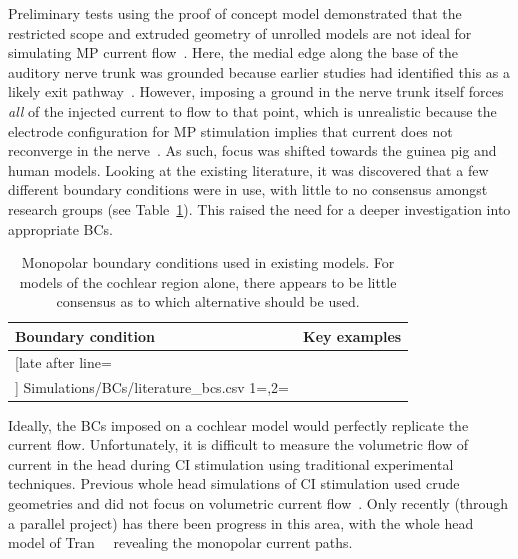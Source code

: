 Preliminary tests using the proof of concept model demonstrated that the
restricted scope and extruded geometry of unrolled models are not ideal for
simulating MP current flow~\cite{wong2012}. Here, the medial edge along the base
of the auditory nerve trunk was grounded because earlier studies had identified
this as a likely exit pathway~\cite{vonbekesy1951,girzon1987}. However, imposing
a ground in the nerve trunk itself forces \emph{all} of the injected current to
flow to that point, which is unrealistic because the electrode configuration for
MP stimulation implies that current does not reconverge in the
nerve~\cite{baker1989}. As such, focus was shifted towards the guinea pig and
human models. Looking at the existing literature, it was discovered that a few
different boundary conditions were in use, with little to no consensus amongst
research groups (see Table~\ref{table:existing_bcs}). This raised the need for a
deeper investigation into appropriate BCs.

\begin{table}
	\centering
	\sffamily
	\small
	\caption[Monopolar boundary conditions used in existing models]{Monopolar
	boundary conditions used in existing models. For models of the cochlear
	region alone, there appears to be little consensus as to which alternative
	should be used.}
	\label{table:existing_bcs}
	
	\begin{tabularx}{0.58\textwidth}{l X}
		\toprule
		\textbf{Boundary condition \phantom{\hspace{8mm}}}	& \textbf{Key examples} \\
		\midrule
		
		\csvreader[late after line=\\]%
			{Simulations/BCs/literature_bcs.csv}%
			{1=\bc,2=\models}%
 			{\bc & \models}%
		\bottomrule
	\end{tabularx}
	
\end{table}

Ideally, the BCs imposed on a cochlear model would perfectly replicate the
\invivo{} current flow. Unfortunately, it is difficult to measure the volumetric
flow of current in the head during CI stimulation using traditional experimental
techniques. Previous whole head simulations of CI stimulation used crude
geometries and did not focus on volumetric current flow~\cite{mens1999}. Only
recently (through a parallel project) has there been progress in this area, with
the whole head model of
Tran~\etal~\cite{tran2011,tran2013ciap,tran2015,tran2015ciap} revealing the
monopolar current paths.

